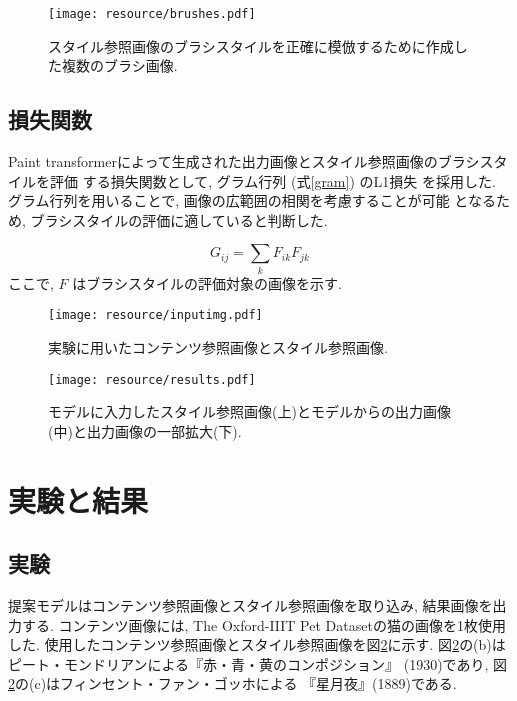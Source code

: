 \documentclass[MIRU,submit,uplatex]{miru2023j}
\begin{document}
\begin{figure}
    \centering
    \texttt{[image: resource/brushes.pdf]}
    \caption{スタイル参照画像のブラシスタイルを正確に模倣するために作成した複数のブラシ画像.}
    \label{fig:brushes}
\end{figure}

\subsection{損失関数}
Paint transformerによって生成された出力画像とスタイル参照画像のブラシスタイルを評価
する損失関数として, グラム行列 (式\eqref{gram}) のL1損失
を採用した. グラム行列を用いることで, 画像の広範囲の相関を考慮することが可能
となるため, ブラシスタイルの評価に適していると判断した.

\begin{equation}
    G_{i j} = \sum_k F_{i k} F_{j k} 
    \label{gram}
\end{equation}
ここで, $F$ はブラシスタイルの評価対象の画像を示す. 

\begin{figure}[t]
    \centering
    \texttt{[image: resource/inputimg.pdf]}
    \caption{実験に用いたコンテンツ参照画像とスタイル参照画像.}
    \label{fig:inputs}
\end{figure}

\begin{figure}[t]
    \centering
    \texttt{[image: resource/results.pdf]}
    \caption{モデルに入力したスタイル参照画像(上)とモデルからの出力画像(中)と出力画像の一部拡大(下).}
    \label{fig:result}
\end{figure}

\section{実験と結果}

\subsection{実験}
提案モデルはコンテンツ参照画像とスタイル参照画像を取り込み, 結果画像を出力する.
コンテンツ画像には, The Oxford-IIIT Pet Dataset\cite{oxford}の猫の画像を1枚使用した.
使用したコンテンツ参照画像とスタイル参照画像を図\ref{fig:inputs}に示す.
図\ref{fig:inputs}の(b)はピート・モンドリアンによる『赤・青・黄のコンポジション』
(1930)であり, 図\ref{fig:inputs}の(c)はフィンセント・ファン・ゴッホによる
『星月夜』(1889)である.
\end{document}
